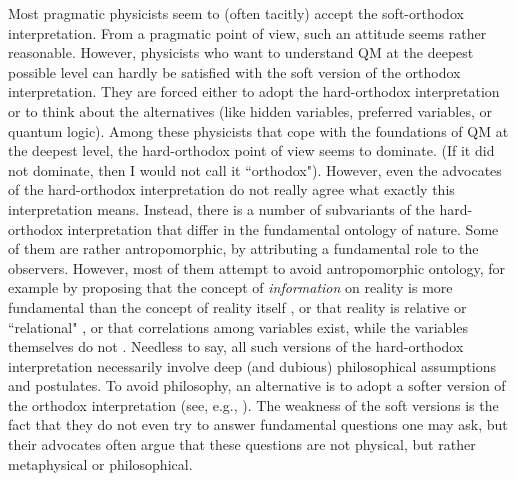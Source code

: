 \documentclass[12pt]{article}
\begin{document}
Most pragmatic physicists seem to (often tacitly) accept the soft-orthodox 
interpretation. From a pragmatic point of view, such an 
attitude seems rather reasonable. However, physicists 
who want to understand QM at the deepest possible level can hardly 
be satisfied with the soft version of the orthodox interpretation.
They are forced either to adopt the hard-orthodox interpretation 
or to think about the alternatives (like hidden 
variables, preferred variables, or quantum logic). 
Among these physicists that cope with the foundations of QM
at the deepest level, 
the hard-orthodox point of view seems to dominate.
(If it did not dominate, then I would not call it ``orthodox").
However, even the advocates of the hard-orthodox interpretation 
do not really agree what exactly this interpretation means.
Instead, there is a number of subvariants of the
hard-orthodox interpretation that differ
in the fundamental ontology of nature.
Some of them are rather antropomorphic, by attributing 
a fundamental role to the observers.
However, most of them attempt to avoid antropomorphic 
ontology, for example by proposing that  
the concept of {\em information} on reality is more fundamental 
than the concept of reality itself \cite{zeil}, 
or that reality is relative or ``relational" 
\cite{rov1,rov2}, or that correlations among variables exist, 
while the variables themselves do not \cite{mermcor}.
Needless to say, all such versions of the hard-orthodox
interpretation necessarily involve deep (and dubious)
philosophical assumptions and postulates.
To avoid philosophy, an alternative is to adopt 
a softer version of the orthodox interpretation 
(see, e.g., \cite{medina}). The weakness of the 
soft versions is the fact that they do not even try to 
answer fundamental questions one may ask, but 
their advocates often argue that these questions are not 
physical, but rather metaphysical or philosophical.    
\end{document}
